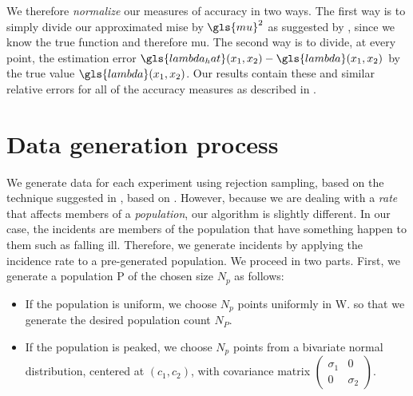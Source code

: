 We therefore \textit{normalize} our measures of accuracy in two ways.
The first way is to simply divide our approximated \gls{mise} by $\gls{mu}^2$
as suggested by \citet{diggle1988equivalence},
since we know the true function and therefore \gls{mu}.
The second way is to divide, at every point,
the estimation error $\gls{lambda_hat}\xvec - \gls{lambda}\xvec$ by the true value $\gls{lambda}\xvec$.
Our results contain these and similar relative errors for all of the accuracy measures
as described in .

\section{Data generation process}
\label{sec:theory:data}

We generate data for each experiment using rejection sampling,
based on the technique suggested in ,
based on \citet{lewis1979simulation}.
However,
because we are dealing with a \textit{rate} that affects members of a \textit{population},
our algorithm is slightly different.
In our case,
the incidents are members of the population that have something happen to them such as falling ill.
Therefore,
we generate incidents by applying the incidence rate to a pre-generated population.
We proceed in two parts.
First, we generate a population \gls{P} of the chosen size $N_p$ as follows:
\begin{itemize}
    \item If the population is uniform,
            we choose $N_p$ points uniformly in \gls{W}.
        so that we generate the desired population count $N_P$.
    \item If the population is peaked,
            we choose $N_p$ points from a bivariate normal distribution,
            centered at $(c_1, c_2)$,
            with covariance matrix
            $\begin{pmatrix}
                \sigma_1 & 0 \\
                0 & \sigma_2
            \end{pmatrix}$.
\end{itemize}


